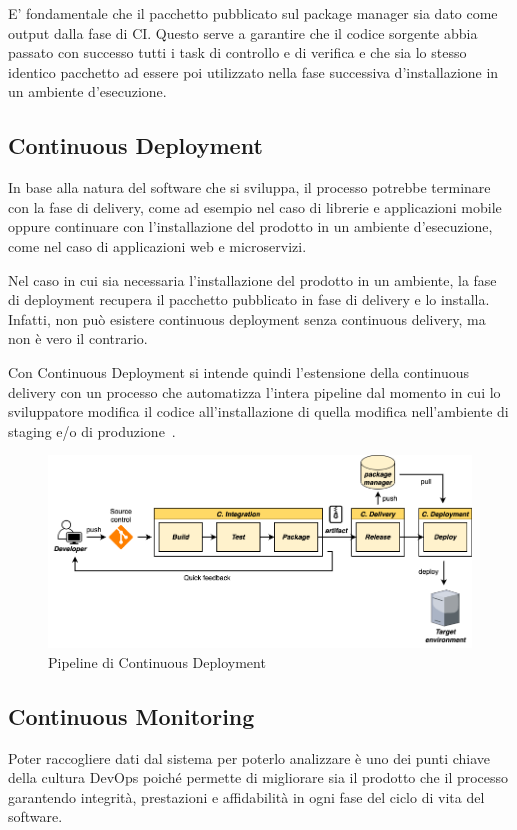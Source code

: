 E' fondamentale che il pacchetto pubblicato sul package manager sia dato come output dalla fase di CI. 
Questo serve a garantire che il codice sorgente abbia passato con successo tutti i task di controllo e di verifica e che sia lo stesso identico pacchetto ad essere poi utilizzato nella fase successiva d'installazione in un ambiente d'esecuzione. 

\subsection{Continuous Deployment}
In base alla natura del software che si sviluppa,
il processo potrebbe terminare con la fase di delivery, 
come ad esempio nel caso di librerie e applicazioni mobile oppure continuare con l'installazione del prodotto in un ambiente d'esecuzione,
come nel caso di applicazioni web e microservizi. 

Nel caso in cui sia necessaria l'installazione del prodotto in un ambiente, 
la fase di deployment recupera il pacchetto pubblicato in fase di delivery e lo installa. 
Infatti, 
non può esistere continuous deployment senza continuous delivery, 
ma non è vero il contrario.

Con Continuous Deployment si intende quindi l'estensione della continuous delivery con un processo che automatizza l'intera pipeline dal momento in cui lo sviluppatore modifica il codice all'installazione di quella modifica nell'ambiente di staging e/o di produzione~\cite{krief2019learning}.

\begin{figure}[H]
    \centering
    \includegraphics[width=1\textwidth]{img/cdeploy-pipeline.png}
    \caption{Pipeline di Continuous Deployment}
    \label{cdeploy-pipeline}
\end{figure}

\subsection{Continuous Monitoring}
Poter raccogliere dati dal sistema per poterlo analizzare è uno dei punti chiave della cultura DevOps poiché permette di migliorare sia il prodotto che il processo garantendo integrità, 
prestazioni e affidabilità in ogni fase del ciclo di vita del software.

